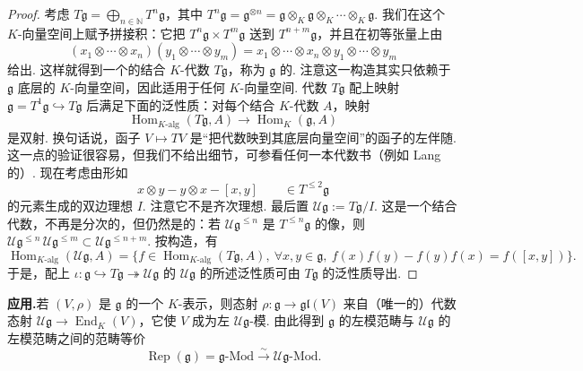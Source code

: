 \begin{proof}
考虑 $T\mathfrak g = \bigoplus_{n \in \mathbb{N}} T^{n}\mathfrak g$，其中 $T^{n}\mathfrak g = \mathfrak g^{\otimes n} = \mathfrak g \otimes_{K} \mathfrak g \otimes_{K} \cdots \otimes_{K} \mathfrak g$. 我们在这个 $K$-向量空间上赋予拼接积：它把 $T^{n}\mathfrak g \times T^{m}\mathfrak g$ 送到 $T^{n+m}\mathfrak g$，并且在初等张量上由
\[(x_{1} \otimes \cdots \otimes x_{n})(y_{1} \otimes \cdots \otimes y_{m}) = x_{1} \otimes \cdots \otimes x_{n} \otimes y_{1} \otimes \cdots \otimes y_{m}\]
给出. 这样就得到一个的结合 $K$-代数 $T\mathfrak g$，称为 $\mathfrak g$ 的.
注意这一构造其实只依赖于 $\mathfrak g$ 底层的 $K$-向量空间，因此适用于任何 $K$-向量空间. 代数 $T\mathfrak g$ 配上映射 $\mathfrak g = T^{1}\mathfrak g \hookrightarrow T\mathfrak g$ 后满足下面的泛性质：对每个结合 $K$-代数 $A$，映射
\[\operatorname{Hom}_{K\text{-alg}}(T\mathfrak g, A) \longrightarrow \operatorname{Hom}_{K}(\mathfrak g, A)\]
是双射. 换句话说，函子 $V \mapsto TV$ 是``把代数映到其底层向量空间''的函子的左伴随. 这一点的验证很容易，但我们不给出细节，可参看任何一本代数书（例如 Lang 的）.
现在考虑由形如
\[x \otimes y - y \otimes x - [x, y] \qquad \in T^{\leqslant 2}\mathfrak g\]
的元素生成的双边理想 $I$. 注意它不是齐次理想. 最后置 $\mathcal{U}\mathfrak g := T\mathfrak g / I$. 这是一个结合代数，不再是分次的，但仍然是的：若 $\mathcal{U}\mathfrak g^{\leqslant n}$ 是 $T^{\leqslant n}\mathfrak g$ 的像，则 $\mathcal{U}\mathfrak g^{\leqslant n}\,\mathcal{U}\mathfrak g^{\leqslant m} \subset \mathcal{U}\mathfrak g^{\leqslant n + m}$. 按构造，有
\[\operatorname{Hom}_{K\text{-alg}}(\mathcal{U}\mathfrak g, A) = \bigl\{ f \in \operatorname{Hom}_{K\text{-alg}}(T\mathfrak g, A),\ \forall x, y \in \mathfrak g,\ f(x)f(y) - f(y)f(x) = f([x, y]) \bigr\}.\]
于是，配上 $\iota : \mathfrak g \hookrightarrow T\mathfrak g \twoheadrightarrow \mathcal{U}\mathfrak g$ 的 $\mathcal{U}\mathfrak g$ 的所述泛性质可由 $T\mathfrak g$ 的泛性质导出.
\end{proof}
\textbf{应用.}\quad 若 $(V, \rho)$ 是 $\mathfrak g$ 的一个 $K$-表示，则态射 $\rho : \mathfrak g \longrightarrow \mathfrak{gl}(V)$ 来自（唯一的）代数态射 $\mathcal{U}\mathfrak g \longrightarrow \operatorname{End}_{K}(V)$，它使 $V$ 成为左 $\mathcal{U}\mathfrak g$-模. 由此得到 $\mathfrak g$ 的左模范畴与 $\mathcal{U}\mathfrak g$ 的左模范畴之间的范畴等价
\[\operatorname{Rep}(\mathfrak g) = \mathfrak g\text{-Mod} \xrightarrow{\ \sim\ } \mathcal{U}\mathfrak g\text{-Mod}.\]
